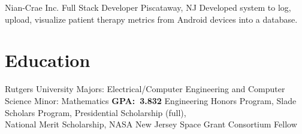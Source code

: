 \documentclass[11pt,letterpaper]{moderncv}
\begin{document}
        {Nian-Crae Inc.}
        {Full Stack Developer}
        {Piscataway, NJ}
        {}
        {Developed system to log, upload, visualize patient therapy metrics from Android devices into a database.\\}

\section{Education}

    {Rutgers University}
    {Majors: Electrical/Computer Engineering and Computer Science \newline Minor: Mathematics}
    {}
    {\textbf{GPA:~3.832}}
    {Engineering Honors Program, Slade Scholars Program, Presidential Scholarship (full),\\National Merit Scholarship, NASA New Jersey Space Grant Consortium Fellow}

\end{document}
